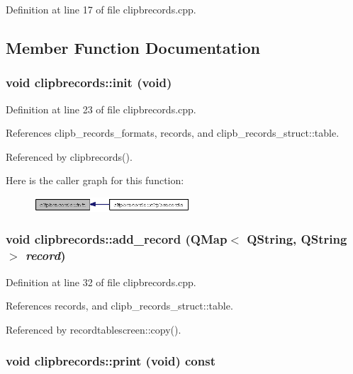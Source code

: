 Definition at line 17 of file clipbrecords.cpp.

\subsection{Member Function Documentation}
\subsubsection{\setlength{\rightskip}{0pt plus 5cm}void clipbrecords::init (void)}\label{classclipbrecords_8f9121a03c82d1d2ad32a81d19cbb1b7}




Definition at line 23 of file clipbrecords.cpp.

References clipb\_\-records\_\-formats, records, and clipb\_\-records\_\-struct::table.

Referenced by clipbrecords().

Here is the caller graph for this function:\begin{figure}[H]
\begin{center}
\leavevmode
\includegraphics[width=165pt]{classclipbrecords_8f9121a03c82d1d2ad32a81d19cbb1b7_icgraph}
\end{center}
\end{figure}
\subsubsection{\setlength{\rightskip}{0pt plus 5cm}void clipbrecords::add\_\-record (QMap$<$ QString, QString $>$ {\em record})}\label{classclipbrecords_6321842c1409b39eaa0433b7e01845bb}




Definition at line 32 of file clipbrecords.cpp.

References records, and clipb\_\-records\_\-struct::table.

Referenced by recordtablescreen::copy().
\subsubsection{\setlength{\rightskip}{0pt plus 5cm}void clipbrecords::print (void) const}\label{classclipbrecords_52fd489523b450d941fc81655bb80bdc}




